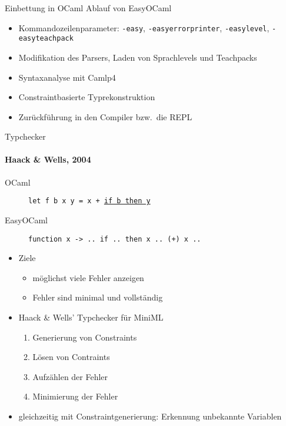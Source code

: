 \documentclass
[handout]
{beamer}
\begin{document}
\begin{frame}{Einbettung in OCaml}
  Ablauf von EasyOCaml
  \begin{itemize}
    \item Kommandozeilenparameter: \texttt{-easy}, \texttt{-easyerrorprinter},
      \texttt{-easylevel}, \texttt{-easyteachpack}
    \item Modifikation des Parsers, Laden von Sprachlevels und Teachpacks
    \item Syntaxanalyse mit Camlp4
    \item Constraintbasierte Typrekonstruktion
    \item Zurückführung in den Compiler bzw.\ die REPL
  \end{itemize}
\end{frame}

\begin{frame}{Typchecker}
  \framesubtitle{Haack \& Wells, 2004}
  \begin{description}
    \item[OCaml] \texttt{let f b x y = x + \underline{if b then y}}
    \item[EasyOCaml] \texttt{function x -> .. if .. then x .. (+)~x ..}%
  \end{description}
  \begin{itemize}
    \item Ziele
      \begin{itemize}
        \item möglichst viele Fehler anzeigen
        \item Fehler sind minimal und vollständig
      \end{itemize}
      \pause
    \item Haack \& Wells' Typchecker für MiniML
      \begin{enumerate}
        \item Generierung von Constraints
        \item Lösen von Contraints
        \item Aufzählen der Fehler
        \item Minimierung der Fehler
      \end{enumerate}
      \pause
    \item gleichzeitig mit Constraintgenerierung: Erkennung unbekannte Variablen
  \end{itemize}
\end{frame}
\end{document}
